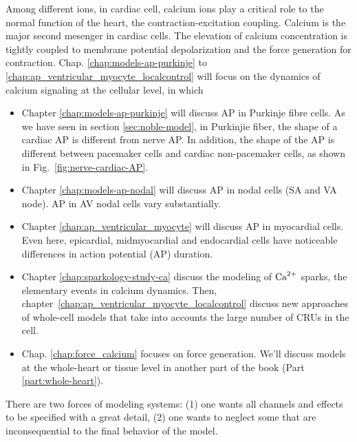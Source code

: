 Among different ions, in cardiac cell, calcium ions play a critical role to the
normal function of the heart, the contraction-excitation coupling. Calcium
is the major second mesenger in cardiac cells. The elevation of calcium
concentration is tightly coupled to membrane potential depolarization and the
force generation for contraction. Chap.
\ref{chap:models-ap-purkinje} to \ref{chap:ap_ventricular_myocyte_localcontrol}
will focus on the dynamics of calcium signaling at the cellular level, in which
\begin{itemize}
\item Chapter \ref{chap:models-ap-purkinje} will discuss AP in Purkinje
  fibre cells. As we have seen in section \ref{sec:noble-model}, in Purkinjie
  fiber, the shape of a cardiac AP is different from nerve AP. In
  addition, the shape of the AP is different between pacemaker cells
  and cardiac non-pacemaker cells, as shown in
  Fig.~\ref{fig:nerve-cardiac-AP}.
  
\item Chapter \ref{chap:models-ap-nodal} will discuss AP in nodal cells
  (SA and VA node). AP in AV nodal cells vary substantially.

\item Chapter \ref{chap:ap_ventricular_myocyte} will discuss AP in
  myocardial cells. Even here, epicardial, midmyocardial and
endocardial cells have noticeable differences in action potential (AP) duration.

\item Chapter \ref{chap:sparkology-study-ca} discuss the modeling of ${\text{Ca}^{2+}}$
sparks, the elementary events in calcium dynamics. Then,
chapter~\ref{chap:ap_ventricular_myocyte_localcontrol} discuss new approaches
  of whole-cell models that take into accounts the large number of CRUs in the
  cell.
  
 \item  Chap. \ref{chap:force_calcium} focuses on force generation. We'll
 discuss models at the whole-heart or tissue level in another part of the book (Part
\ref{part:whole-heart}).

\end{itemize}

\begin{framed}
There are two forces of modeling systems: (1) one wants all channels and effects
to be specified with a great detail, (2) one wants to neglect some that are
inconsequential  to the final behavior of the model.
\end{framed}

